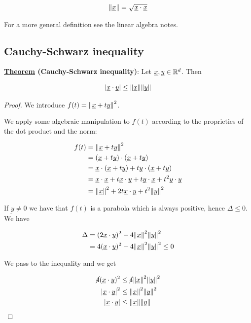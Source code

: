 \documentclass[10pt]{extarticle}
\renewcommand{\vec}[1]{\underbar{\ensuremath{#1}}}
\begin{document}
$$
    \norm{\vec{x}} = \sqrt{\vec{x} \cdot \vec{x}}
$$

For a more general definition see the linear algebra notes.

\subsection{Cauchy-Schwarz inequality}

\textbf{\underline{Theorem} (Cauchy-Schwarz inequality)}: Let $\vec{x}, \vec{y} \in \R^d$. Then

$$
    \abs{\vec{x} \cdot \vec{y}} \leq \norm{\vec{x}} \norm{\vec{y}}
$$

\begin{proof}
    We introduce $f(t) = \norm{\vec{x} + t \vec{y}}^2$.

    We apply some algebraic manipulation to $f(t)$ according to the proprieties of the dot product and the norm:

    \begin{align*}
        f(t) & = \norm{\vec{x} + t \vec{y}}^2                                                                          \\
             & = (\vec{x} + t \vec{y}) \cdot (\vec{x} + t \vec{y})                                                     \\
             & = \vec{x} \cdot (\vec{x} + t \vec{y}) + t \vec{y} \cdot (\vec{x} + t \vec{y})                           \\
             & = \vec{x} \cdot \vec{x} + t \vec{x} \cdot \vec{y} + t \vec{y} \cdot \vec{x} + t^2 \vec{y} \cdot \vec{y} \\
             & = \norm{\vec{x}}^2 + 2t \vec{x} \cdot \vec{y} + t^2 \norm{\vec{y}}^2
    \end{align*}

    If $\vec{y} \ne 0$ we have that $f(t)$ is a parabola which is always positive, hence $\Delta \leq 0$. We have

    \begin{align*}
        \Delta & = (2 \vec{x} \cdot \vec{y})^2 - 4 \norm{\vec{x}}^2 \norm{\vec{y}}^2        \\
               & = 4 (\vec{x} \cdot \vec{y})^2 - 4 \norm{\vec{x}}^2 \norm{\vec{y}}^2 \leq 0 \\
    \end{align*}

    We pass to the inequality and we get

    \begin{align*}
        \cancel{4}(\vec{x} \cdot \vec{y})^2 & \leq \cancel{4} \norm{\vec{x}}^2 \norm{\vec{y}}^2 \\
        \abs{\vec{x} \cdot \vec{y}} ^2      & \leq \norm{\vec{x}}^2 \norm{\vec{y}}^2            \\
        \abs{\vec{x} \cdot \vec{y}}         & \leq \norm{\vec{x}} \norm{\vec{y}}
    \end{align*}
\end{proof}
\end{document}
